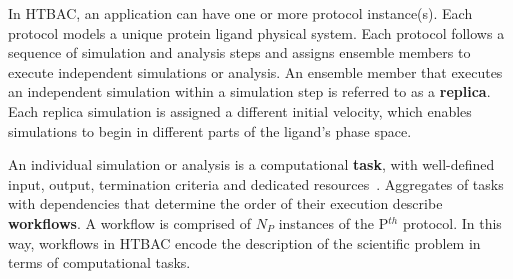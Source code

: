 In HTBAC, an application can have one or more protocol instance(s). Each
protocol models a unique protein ligand physical system. Each protocol
follows a sequence of simulation and analysis steps and assigns ensemble
members to execute independent simulations or analysis. An ensemble member
that executes an independent simulation within a simulation step is referred
to as a \textbf{replica}. Each replica simulation is assigned a different
initial velocity, which enables simulations to begin in different parts of
the ligand's phase space.

An individual simulation or analysis is a computational \textbf{task}, with
well-defined input, output, termination criteria and dedicated
resources~\cite{power-of-many17}. Aggregates of tasks with dependencies that
determine the order of their execution describe \textbf{workflows}. A
workflow is comprised of $N_P$ instances of the P$^{th}$ protocol. In this
way, workflows in HTBAC encode the description of the scientific problem in
terms of computational tasks.









